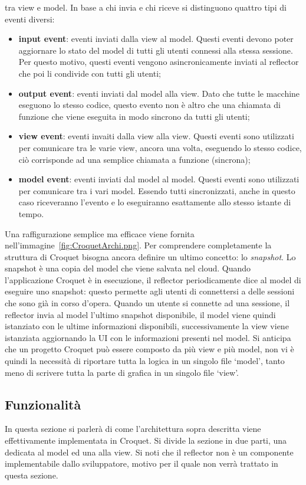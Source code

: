 tra view e model. In base a chi invia e chi riceve si distinguono quattro tipi di eventi diversi:
\begin{itemize}
    \item \textbf{input event}: eventi inviati dalla view al model. Questi eventi devono poter aggiornare lo stato del model di tutti gli utenti connessi alla stessa sessione. Per 
    questo motivo, questi eventi vengono asincronicamente inviati al reflector che poi li condivide con tutti gli utenti;
    \item \textbf{output event}: eventi inviati dal model alla view. Dato che tutte le macchine eseguono lo stesso codice, questo evento non è altro che una chiamata di funzione
    che viene eseguita in modo sincrono da tutti gli utenti;
    \item \textbf{view event}: eventi invaiti dalla view alla view. Questi eventi sono utilizzati per comunicare tra le varie view, ancora una volta, eseguendo lo stesso codice,
    ciò corrisponde ad una semplice chiamata a funzione (sincrona);
    \item \textbf{model event}: eventi inviati dal model al model. Questi eventi sono utilizzati per comunicare tra i vari model. Essendo tutti sincronizzati, anche in questo caso
    riceveranno l'evento e lo eseguiranno esattamente allo stesso istante di tempo.
\end{itemize}
Una raffigurazione semplice ma efficace viene fornita nell'immagine~\ref{fig:CroquetArchi.png}.
Per comprendere completamente la struttura di Croquet bisogna ancora definire un ultimo concetto: lo \textit{snapshot}. Lo snapshot è una copia del model che viene salvata nel cloud.
Quando l'applicazione Croquet è in esecuzione, il reflector periodicamente dice al model di eseguire uno snapshot: questo permette agli utenti di connettersi a delle sessioni che 
sono già in corso d'opera. Quando un utente si connette ad una sessione, il reflector invia al model l'ultimo snapshot disponibile, il model viene quindi istanziato con le ultime
informazioni disponibili, successivamente la view viene istanziata aggiornando la UI con le informazioni presenti nel model. Si anticipa che un progetto Croquet può essere 
composto da più view e più model, non vi è quindi la necessità di riportare tutta la logica in un singolo file `model', tanto meno di scrivere tutta la parte di grafica in un singolo
file `view'.\\

\subsection{Funzionalità}\label{subsec:Croquet_funzionalita}
In questa sezione si parlerà di come l'architettura sopra descritta viene effettivamente implementata in Croquet. Si divide la sezione in due parti, una dedicata al model ed una alla
view. Si noti che il reflector non è un componente implementabile dallo sviluppatore, motivo per il quale non verrà trattato in questa sezione.\\
